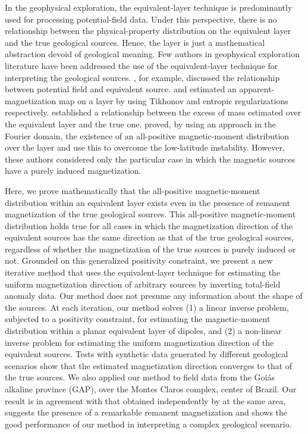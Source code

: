 In the geophysical exploration, the equivalent-layer technique is predominantly used for processing potential-field data. 
Under this perspective, there is no relationship between the physical-property distribution on the equivalent layer 
and the true geological sources. Hence, the layer is just a mathematical abstraction devoid of geological meaning. 
Few authors in geophysical exploration literature have been addressed the use of the equivalent-layer technique for interpreting
the geological sources. \cite{pedersen1991}, for example, discussed the relationship between potential field and equivalent source. 
\cite{medeiros_silva1996} and \cite{silvadias_etal_2010} estimated an apparent-magnetization map on a layer by using Tikhonov and 
entropic regularizations respectively. \cite{siqueira_etal_2017} established a relationship between the excess of mass estimated 
over the equivalent layer and the true one. \cite{li_etal_2014} proved, by using an approach in the Fourier domain, 
the existence of an all-positive magnetic-moment distribution over the layer and use this to overcome the low-latitude instability. 
However, these authors considered only the particular case in which the magnetic sources have a purely induced magnetization.

Here, we prove mathematically that the all-positive magnetic-moment distribution within an equivalent layer exists even in the 
presence of remanent magnetization of the true geological sources. This all-positive magnetic-moment distribution holds true for 
all cases in which the magnetization direction of the equivalent sources has the same direction as that of the true geological sources, 
regardless of whether the magnetization of the true sources is purely induced or not. Grounded on this generalized positivity constraint, 
we present a new iterative method that uses the equivalent-layer technique for estimating the uniform magnetization direction of 
arbitrary sources by inverting total-field anomaly data. Our method does not presume any information about the shape of the sources. 
At each iteration, our method solves (1) a linear inverse problem, subjected to a positivity constraint, for estimating the magnetic-moment 
distribution within a planar equivalent layer of dipoles, and (2) a non-linear inverse problem for estimating the uniform magnetization 
direction of the equivalent sources. Tests with synthetic data generated by different geological scenarios show that the estimated magnetization
direction converges to that of the true sources. We also applied our method to field data from the Goi{\' a}s alkaline province (GAP), 
over the Montes Claros complex, center of Brazil. Our result is in agreement with that obtained independently by \cite{zhang_etal_2018} 
at the same area, suggests the presence of a remarkable remanent magnetization and shows the good performance of our method in interpreting 
a complex geological scenario.
